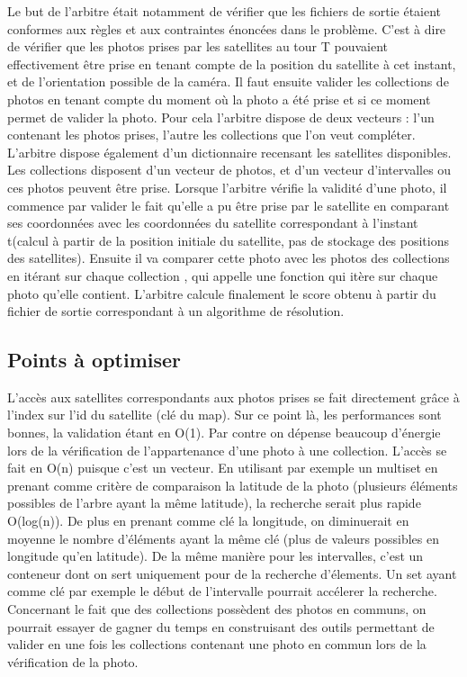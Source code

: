\documentclass[11pt]{article}
\begin{document}
	Le but de l'arbitre était notamment de vérifier que les fichiers de sortie étaient conformes aux règles et aux contraintes énoncées dans le problème. C'est à dire de vérifier que les photos prises par les satellites au tour T pouvaient effectivement être prise en tenant compte de la position du satellite à cet instant, et de l'orientation possible de la caméra. Il faut ensuite valider les collections de photos en tenant compte du moment où la photo a été prise et si ce moment permet de valider la photo. Pour cela l'arbitre dispose de deux vecteurs : l'un contenant les photos prises, l'autre les collections que l'on veut compléter. L'arbitre dispose également d'un dictionnaire recensant les satellites disponibles. 
	Les collections disposent d'un vecteur de photos, et d'un vecteur d'intervalles ou ces photos peuvent être prise. 
	Lorsque l'arbitre vérifie la validité d'une photo, il commence par valider le fait qu'elle a pu être prise par le satellite en comparant ses coordonnées avec les coordonnées du satellite correspondant à l'instant t(calcul à partir de la position initiale du satellite, pas de stockage des positions des satellites). Ensuite il va comparer cette photo avec les photos des collections en itérant sur chaque collection , qui appelle une fonction qui itère sur chaque photo qu'elle contient. 
	L'arbitre calcule finalement le score obtenu à partir du fichier de sortie correspondant à un algorithme de résolution.
	\subsection{Points à optimiser}
	\label{subsection:points_a_optimiser}

	L'accès aux satellites correspondants aux photos prises se fait directement grâce à l'index sur l'id du satellite (clé du map). Sur ce point là, les performances sont bonnes, la validation étant en O(1). 
	Par contre on dépense beaucoup d'énergie lors de la vérification de l'appartenance d'une photo à une collection. L'accès se fait en O(n) puisque c'est un vecteur. En utilisant par exemple un multiset en prenant comme critère de comparaison la latitude de la photo (plusieurs éléments possibles de l'arbre ayant la même latitude), la recherche serait plus rapide O(log(n)). De plus en prenant comme clé la longitude, on diminuerait en moyenne le nombre d'éléments ayant la même clé (plus de valeurs possibles en longitude qu'en latitude). De la même manière pour les intervalles, c'est un conteneur dont on sert uniquement pour de la recherche d'élements. Un set ayant comme clé par exemple le début de l'intervalle pourrait accélerer la recherche.
	Concernant le fait que des collections possèdent des photos en communs, on pourrait essayer de gagner du temps en construisant des outils permettant de valider en une fois les collections contenant une photo en commun lors de la vérification de la photo.
\end{document}
